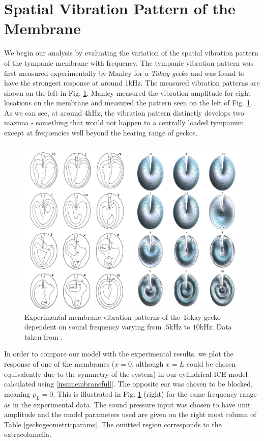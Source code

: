\section{Spatial Vibration Pattern of the Membrane}\label{vibrationpatternchapter}
We begin our analysis by evaluating the variation of the spatial vibration pattern of the tympanic membrane
with frequency. The tympanic vibration pattern was first measured experimentally by Manley \cite{manleygecko1}
for a \emph{Tokay gecko} and was found to have the strongest response at around 1kHz. The measured vibration patterns
are shown on the left in Fig. \ref{manleygeckotympanum}. Manley measured the vibration amplitude for eight locations on the membrane and measured the pattern
seen on the left of Fig. \ref{manleygeckotympanum}. As we can see, at around $4$kHz, the vibration pattern
distinctly develops two maxima - something that would not happen to a centrally loaded tympanum except
at frequencies well beyond the hearing range of geckos.
\begin{figure}[ht!]
 \centering
 \includegraphics[width=1.0\linewidth]{Diagrams/manleymodelcomparison.png}
 \caption[Tympanic membrane vibration profiles for the Tokay gecko.]{Experimental membrane vibration patterns of the Tokay gecko dependent
 on sound frequency varying from $.5$kHz to $10$kHz. Data taken from \cite{manleygecko1}.}
  \label{manleygeckotympanum}
\end{figure}

In order to compare our model with the experimental results, we plot the response of one of the membranes ($x=0$, although $x=L$ could be
chosen equivalently due to the symmetry of the system) in our cylindrical ICE model 
calculated using \eqref{ipsimembranefull}. The opposite ear was chosen to be blocked, meaning $p_L=0$. 
This is illustrated in Fig. \ref{manleygeckotympanum} (right) for the same frequency range as in the experimental data. The sound pressure input was chosen to have unit amplitude and the model parameters used are given
on the right most column of Table \ref{geckogeometricparams}. The omitted region corresponds to the extracolumella. 

